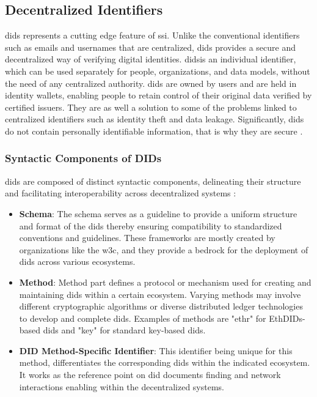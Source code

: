 \subsection{Decentralized Identifiers}

\gls{did}s represents a cutting edge feature of \gls{ssi}. Unlike the conventional identifiers such as emails and usernames that are 
centralized, \gls{did}s provides a secure and decentralized way of verifying digital identities. \gls{did}sis an individual identifier, which can be used separately for people, 
organizations, and data models, without the need of any centralized authority. \gls{did}s are owned by users and are held in identity wallets, enabling people to retain control 
of their original data verified by certified issuers. \cite{ciscofpie} They are as well a solution to some of the problems linked to centralized identifiers such as identity theft and data 
leakage. Significantly, \gls{did}s do not contain personally identifiable information, that is why they are secure \cite{9333997}. 

\subsubsection{Syntactic Components of DIDs}

\gls{did}s are composed of distinct syntactic components, delineating their structure and facilitating interoperability across decentralized systems \cite{w3didcore} :

\begin{itemize}
  \item \textbf{Schema}: The schema serves as a guideline to provide a uniform structure and format of the \gls{did}s thereby ensuring compatibility to standardized conventions 
  and guidelines. These frameworks are mostly created by organizations like the \gls{w3c}, and they provide a bedrock for the deployment of \gls{did}s across
  various ecosystems.
  \item \textbf{Method}: Method part defines a protocol or mechanism used for creating and maintaining \gls{did}s within a certain ecosystem. Varying methods may involve different
  cryptographic algorithms or diverse distributed ledger technologies to develop and complete \gls{did}s. Examples of methods are "ethr" for EthDIDs-based \gls{did}s and "key" for 
  standard key-based \gls{did}s.
  \item \textbf{DID Method-Specific Identifier}: This identifier being unique for this method, differentiates the corresponding \gls{did}s within the indicated ecosystem. It 
  works as the reference point on \gls{did} documents finding and network interactions enabling within the decentralized systems.
\end{itemize}


